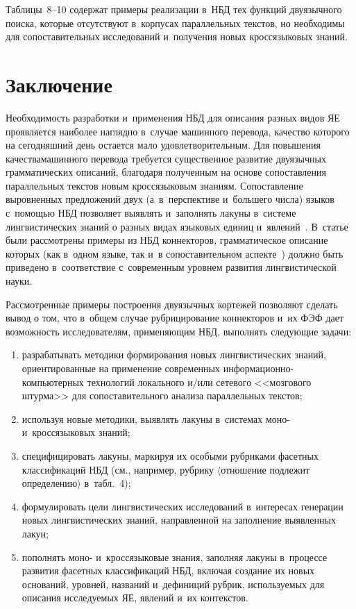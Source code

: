 \begin{multicols}{2}
  
  Таблицы~8--10 содержат примеры реализации в~НБД тех функций 
двуязычного поиска, которые отсутствуют в~корпусах параллельных текстов, 
но необходимы для сопоставительных исследований и~получения новых 
кроссязыковых знаний.

\vspace*{-6pt}
  
\section{Заключение}

  Необходимость разработки и~применения НБД для описания разных видов 
ЯЕ проявляется наиболее наглядно в~случае машинного 
перевода, качество которого на сегодняшний день остается мало 
удовлетворительным. Для повышения качества\linebreak машинного перевода 
требуется существенное развитие двуязычных грамматических описаний,\linebreak 
благодаря полученным на основе сопоставления параллельных текстов 
новым кроссязыковым знаниям. Сопоставление выровненных предложений 
двух (а~в~перспективе и~большего чис\-ла) языков с~помощью НБД позволяет 
выявлять и~заполнять лакуны в~системе лингвистических знаний о разных 
видах языковых единиц и~явлений~\cite{5-zat, 16-zat}. В~статье были 
рассмотрены примеры из НБД коннекторов, грамматическое описание 
которых (как в~одном языке, так и~в сопоставительном аспекте~\cite{17-zat}) 
должно быть приведено в~соответствие с~современным уровнем развития 
лингвистической \mbox{науки}.
{

}
  
  Рассмотренные примеры построения двуязычных кортежей позволяют 
сделать вывод о том, что в~общем случае рубрицирование коннекторов и~их 
ФЭФ дает возможность исследователям, применяющим НБД, выполнять 
следующие задачи:
  \begin{enumerate}[(1)]
\item разрабатывать методики формирования новых лингвистических 
знаний, ориентированные на применение современных  
ин\-фор\-ма\-ци\-он\-но-компью\-тер\-ных технологий локального и/или 
сетевого <<мозгового штурма>> для сопоставительного анализа 
параллельных текстов;
\item используя новые методики, выявлять лакуны в~системах моно- 
и~кроссязыковых знаний;
\item специфицировать лакуны, маркируя их особыми рубриками 
фасетных классификаций НБД (см., например, рубрику $\langle$отношение 
подлежит определению$\rangle$ в~табл.~4);
\item формулировать цели лингвистических исследований в~интересах 
генерации новых лингвистических знаний, направленной на заполнение 
выявленных лакун;
\item пополнять моно- и~кроссязыковые знания, заполняя лакуны 
в~процессе развития фасетных классификаций НБД, включая создание их 
новых оснований, уровней, названий и~дефиниций рубрик, используемых 
для описания исследуемых ЯЕ, явлений и~их контекстов.
\end{enumerate}


\end{multicols}
